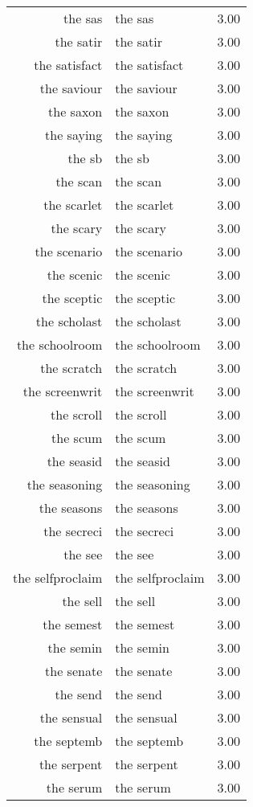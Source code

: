 \begin{table}[ht]
\begin{tabular}{rlr}
  the sas & the sas & 3.00 \\ 
  the satir & the satir & 3.00 \\ 
  the satisfact & the satisfact & 3.00 \\ 
  the saviour & the saviour & 3.00 \\ 
  the saxon & the saxon & 3.00 \\ 
  the saying & the saying & 3.00 \\ 
  the sb & the sb & 3.00 \\ 
  the scan & the scan & 3.00 \\ 
  the scarlet & the scarlet & 3.00 \\ 
  the scary & the scary & 3.00 \\ 
  the scenario & the scenario & 3.00 \\ 
  the scenic & the scenic & 3.00 \\ 
  the sceptic & the sceptic & 3.00 \\ 
  the scholast & the scholast & 3.00 \\ 
  the schoolroom & the schoolroom & 3.00 \\ 
  the scratch & the scratch & 3.00 \\ 
  the screenwrit & the screenwrit & 3.00 \\ 
  the scroll & the scroll & 3.00 \\ 
  the scum & the scum & 3.00 \\ 
  the seasid & the seasid & 3.00 \\ 
  the seasoning & the seasoning & 3.00 \\ 
  the seasons & the seasons & 3.00 \\ 
  the secreci & the secreci & 3.00 \\ 
  the see & the see & 3.00 \\ 
  the selfproclaim & the selfproclaim & 3.00 \\ 
  the sell & the sell & 3.00 \\ 
  the semest & the semest & 3.00 \\ 
  the semin & the semin & 3.00 \\ 
  the senate & the senate & 3.00 \\ 
  the send & the send & 3.00 \\ 
  the sensual & the sensual & 3.00 \\ 
  the septemb & the septemb & 3.00 \\ 
  the serpent & the serpent & 3.00 \\ 
  the serum & the serum & 3.00 \\ 

\end{tabular}
\end{table}
